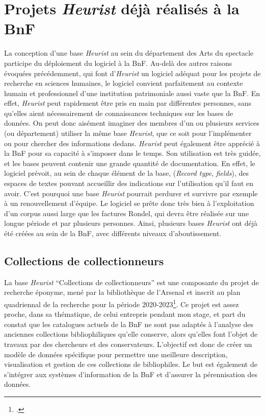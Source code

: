 \section{Projets \emph{Heurist} déjà réalisés à la BnF}


La conception d'une base \emph{Heurist} au sein du département des Arts du spectacle participe du déploiement du logiciel à la BnF. Au-delà des autres raisons évoquées précédemment, qui font d'\emph{Heurist} un logiciel adéquat pour les projets de recherche en sciences humaines, le logiciel convient parfaitement au contexte humain et professionnel d'une institution patrimoniale aussi vaste que la BnF. En effet, \emph{Heurist} peut rapidement être pris en main par différentes personnes, sans qu'elles aient nécessairement de connaissances techniques sur les bases de données. On peut donc aisément imaginer des membres d'un ou plusieurs services (ou département) utiliser la même base \emph{Heurist}, que ce soit pour l'implémenter ou pour chercher des informations dedans. \emph{Heurist} peut également être apprécié à la BnF pour sa capacité à s'imposer dans le temps. Son utilisation est très guidée, et les bases peuvent contenir une grande quantité de documentation. En effet, le logiciel prévoit, au sein de chaque élément de la base, (\emph{Record type}, \emph{fields}), des espaces de textes pouvant accueillir des indications sur l'utilisation qu'il faut en avoir. 
C'est pourquoi une base \emph{Heurist} pourrait perdurer et survivre par exemple à un renouvellement d'équipe. Le logiciel se prête donc très bien à l'exploitation d'un corpus aussi large que les factures Rondel, qui devra être réalisée sur une longue période et par plusieurs personnes. 
Ainsi, plusieurs bases \emph{Heurist} ont déjà été créées au sein de la BnF, avec différents niveaux d'aboutissement. 

\subsection{Collections de collectionneurs}

La base \emph{Heurist} \enquote{Collections de collectionneurs} est une composante du projet de recherche éponyme, mené par la bibliothèque de l'Arsenal et inscrit au plan quadriennal de la recherche pour la période 2020-2023\footcite{noauthor_plan_nodate}. 
Ce projet est assez proche, dans sa thématique, de celui entrepris pendant mon stage, et part du constat que les catalogues actuels de la BnF ne sont pas adaptés à l'analyse des anciennes collections bibliophiliques qu'elle conserve, alors qu'elles font l'objet de travaux par des chercheurs et des conservateurs. L'objectif est donc de créer un modèle de données spécifique pour permettre une meilleure description, visualisation et gestion de ces collections de bibliophiles. Le but est également de s'intégrer aux systèmes d'information de la BnF et d'assurer la pérennisation des données.

